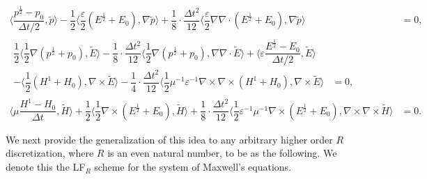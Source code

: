 \documentclass{amsart}
\theoremstyle{thmstyleone}%
\theoremstyle{thmstyletwo}%
\theoremstyle{thmstylethree}%
\newcommand{\aInnerproduct}[2]{\bigl\langle #1, #2 \bigr\rangle}
\begin{document}
\begin{subequations}
  \begin{align}
    \aInnerproduct{\dfrac{p^{\frac{1}{2}} - p_0}{\Delta t/2}}{\widetilde{p}} - \dfrac{1}{2} \aInnerproduct{\dfrac{\varepsilon}{2} \left( E^{\frac{1}{2}} + E_0 \right)}{\nabla \widetilde{p}} + \dfrac{1}{8} \cdot \dfrac{\Delta t^2}{12} \aInnerproduct{\dfrac{\varepsilon}{2} \nabla \nabla \cdot \left( E^{\frac{1}{2}} + E_0 \right)}{\nabla \widetilde{p}} &= 0, \label{eqn:maxwell_p0_lf4} \\
    \begin{split}
  \dfrac{1}{2}  \aInnerproduct{\dfrac{1}{2} \nabla \left(  p^{\frac{1}{2}} +  p_0 \right)}{\widetilde{E}} - \dfrac{1}{8} \cdot \dfrac{\Delta t^2}{12} \aInnerproduct{\dfrac{1}{2} \nabla \left(  p^{\frac{1}{2}} +  p_0 \right)}{\nabla \nabla \cdot \widetilde{E}} + \aInnerproduct{\varepsilon \dfrac{E^{\frac{1}{2}} - E_0}{\Delta t/2}}{\widetilde{E}}\\  - \aInnerproduct{\dfrac{1}{2} \left( H^1 + H_0 \right)}{\nabla \times \widetilde{E}} -\dfrac{1}{4} \cdot \dfrac{\Delta t^2}{12}  \aInnerproduct{\dfrac{1}{2} \mu^{-1}\varepsilon^{-1} \nabla \times \nabla \times \left( H^1 + H_0 \right)}{\nabla \times \widetilde{E}} &= 0, \label{eqn:maxwell_E0_lf4} 
  \end{split} \\
    \aInnerproduct{\mu \dfrac{H^1 - H_0}{\Delta t}}{\widetilde{H}} + \dfrac{1}{2} \aInnerproduct{\dfrac{1}{2} \nabla \times \left(E^{\frac{1}{2}} + E_0 \right)}{\widetilde{H}} + \dfrac{1}{8} \cdot \dfrac{\Delta t^2}{12} \aInnerproduct{\dfrac{1}{2} \varepsilon^{-1}\mu^{-1} \nabla \times \left(E^{\frac{1}{2}} + E_0 \right)}{ \nabla \times \nabla \times  \widetilde{H}} &= 0. \label{eqn:maxwell_H0_lf4}
  \end{align}
\end{subequations}

We next provide the generalization of this idea to any arbitrary higher order $R$ discretization, where $R$ is an even natural number, to be as the following. We denote this the LF$_R$ scheme for the system of Maxwell's equations.
\end{document}
